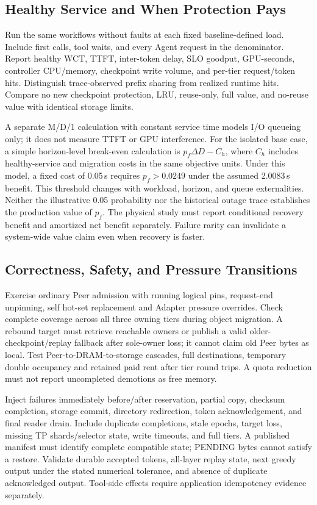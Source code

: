 \documentclass[sigplan,10pt,anonymous,nonacm]{acmart}
\begin{document}
\FloatBarrier
\subsection{Healthy Service and When Protection Pays}

Run the same workflows without faults at each fixed baseline-defined
load. Include first calls, tool waits, and every Agent request in the
denominator. Report healthy WCT, TTFT, inter-token delay, SLO goodput,
GPU-seconds, controller CPU/memory, checkpoint write volume, and per-tier
request/token hits. Distinguish trace-observed prefix sharing from
realized runtime hits. Compare no new checkpoint protection, LRU,
reuse-only, full value, and no-reuse value with identical storage limits.

A separate M/D/1 calculation with constant service time models I/O queueing only; it does not measure TTFT or GPU interference. For the isolated base case, a simple horizon-level
break-even calculation is $p_f\Delta D-C_h$, where $C_h$ includes
healthy-service and migration costs in the same objective units.
Under this model, a fixed cost of 0.05\,s
requires $p_f>0.0249$ under the assumed 2.0083\,s benefit. This threshold
changes with workload, horizon, and queue externalities. Neither the
illustrative 0.05 probability nor the historical outage trace establishes
the production value of $p_f$. The physical study must report conditional
recovery benefit and amortized net benefit separately. Failure rarity
can invalidate a system-wide value claim even when recovery is faster.

\FloatBarrier
\subsection{Correctness, Safety, and Pressure Transitions}

Exercise ordinary Peer admission with running logical pins, request-end
unpinning, self hot-set replacement and Adapter pressure overrides.
Check complete coverage across all three owning tiers during object
migration. A rebound target must retrieve reachable owners or publish a
valid older-checkpoint/replay fallback after sole-owner loss; it cannot
claim old Peer bytes as local. Test Peer-to-DRAM-to-storage cascades, full
destinations, temporary double occupancy and retained paid rent after
tier round trips. A quota reduction must not report uncompleted demotions
as free memory.

Inject failures immediately before/after reservation, partial copy,
checksum completion, storage commit, directory redirection, token
acknowledgement, and final reader drain. Include duplicate completions,
stale epochs, target loss, missing TP shards/selector state, write timeouts,
and full tiers. A published manifest must identify complete compatible
state; PENDING bytes cannot satisfy a restore. Validate durable accepted
tokens, all-layer replay state, next greedy output under the stated
numerical tolerance, and absence of duplicate acknowledged output.
Tool-side effects require application idempotency evidence separately.
\end{document}

